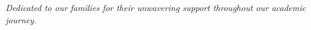 \vspace{3cm}
\begin{center}
\textit{Dedicated to our families for their unwavering support throughout our academic journey.}
\end{center}
